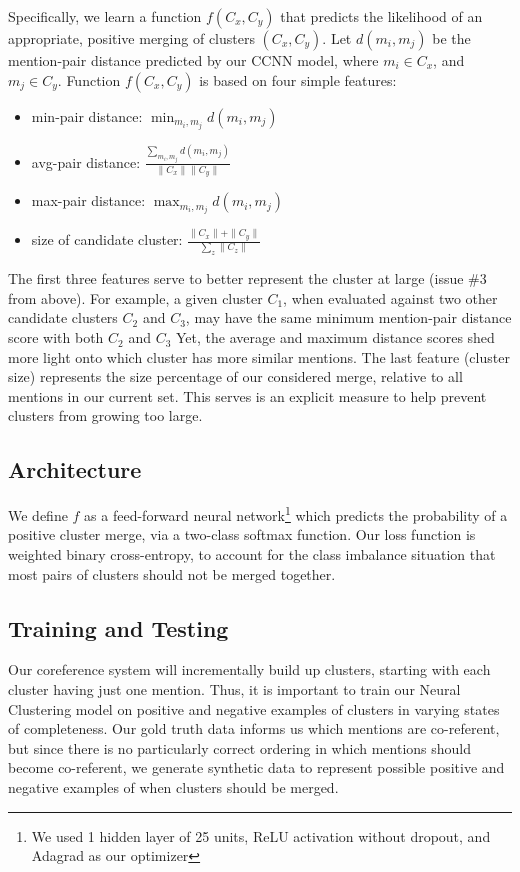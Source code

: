 \documentclass[11pt,a4paper]{article}
\begin{document}
Specifically, we learn a function $f(C_x,C_y)$ that predicts the likelihood of an appropriate, positive merging of clusters $(C_x,C_y)$. Let $d(m_i,m_j)$ be the mention-pair distance predicted by our CCNN model, where $m_i \in C_x$, and $m_j \in C_y$.  Function $f(C_x,C_y)$ is based on four simple features:
\begin{itemize}
  \item min-pair distance: $\min_{m_i,m_j} d(m_i,m_j)$
  \item avg-pair distance: $\frac{\sum_{m_i, m_j} d(m_i,m_j)}{\|C_x\|\|C_y\|}$
  \item max-pair distance: $\max_{m_i,m_j} d(m_i,m_j)$
  \item size of candidate cluster: $\frac{\|C_x\| + \|C_y\|}{\sum_{z}{\|C_z\|}}$
\end{itemize}

The first three features serve to better represent the cluster at large (issue \#3 from above).  For example, a given cluster $C_1$, when evaluated against two other candidate clusters $C_2$ and $C_3$, may have the same minimum mention-pair distance score with both $C_2$ and $C_3$  Yet, the average and maximum distance scores shed more light onto which cluster has more similar mentions. The last feature (cluster size) represents the size percentage of our considered merge, relative to all mentions in our current set.  This serves is an explicit measure to help prevent clusters from growing too large.

\subsection{Architecture}
We define $f$ as a feed-forward neural network\footnote{We used 1 hidden layer of 25 units, ReLU activation without dropout, and Adagrad as our optimizer} which predicts the probability of a positive cluster merge, via a two-class softmax function.  Our loss function is weighted binary cross-entropy, to account for the class imbalance situation that most pairs of clusters should not be merged together.  

\subsection{Training and Testing}
Our coreference system will incrementally build up clusters, starting with each cluster having just one mention.  Thus, it is important to train our Neural Clustering model on positive and negative examples of clusters in varying states of completeness.  Our gold truth data informs us which mentions are co-referent, but since there is no particularly correct ordering in which mentions should become co-referent, we generate synthetic data to represent possible positive and negative examples of when clusters should be merged.
\end{document}
